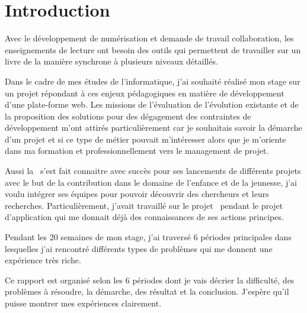 \chapter*{Introduction}

Avec le développement de numérisation et demande de travail collaboration, les enseignements de lecture ont besoin des outils qui permettent de travailler sur un livre de la manière synchrone à plusieurs niveaux détaillés. 

Dans le cadre de mes études de l'informatique, j'ai souhaité réalisé mon stage sur un projet répondant à ces enjeux pédagogiques en matière de développement d'une plate-forme web. Les missions de l'évaluation de l'évolution existante et de la proposition des solutions pour des dégagement des contraintes de développement m'ont attirés particulièrement car je souhaitais savoir la démarche d'un projet et si ce type de métier pouvait m'intéresser alors que je m'oriente dans ma formation et professionnellement vers le management de projet. 

Aussi la \pe\ s'est fait connaitre avec succès pour ses lancements de différents projets avec le but de la contribution dans le domaine de l'enfance et de la jeunesse, j'ai voulu intégrer ses équipes pour pouvoir découvrir des chercheurs et leurs recherches. Particulièrement, j'avait travaillé sur le projet \ezb\ pendant le projet d'application qui me donnait déjà des connaissances de ses actions principes.

Pendant les 20 semaines de mon stage, j’ai traversé 6 périodes principales dans lesquelles j’ai rencontré différents types de problèmes qui me donnent une expérience très riche. 

Ce rapport est organisé selon les 6 périodes dont je vais décrier la difficulté, des problèmes à résoudre, la démarche, des résultat et la conclusion. J’espère qu’il puisse montrer mes expériences clairement. 